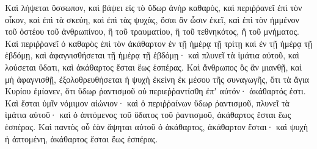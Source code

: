 {Καὶ λήψεται ὕσσωπον, καὶ βάψει εἰς τὸ ὕδωρ ἀνὴρ καθαρὸς, καὶ περιῤῥανεῖ ἐπὶ τὸν οἶκον, καὶ ἐπὶ τὰ σκεύη, καὶ ἐπὶ τὰς ψυχὰς, ὅσαι ἂν ὦσιν ἐκεῖ, καὶ ἐπὶ τὸν ἡμμένον τοῦ ὀστέου τοῦ ἀνθρωπίνου, ἢ τοῦ τραυματίου, ἢ τοῦ τεθνηκότος, ἢ τοῦ μνήματος.
Καὶ περιῤῥανεῖ ὁ καθαρὸς ἐπὶ τὸν ἀκάθαρτον ἐν τῇ ἡμέρᾳ τῇ τρίτῃ καὶ ἐν τῇ ἡμέρᾳ τῇ ἑβδόμῃ, καὶ ἀφαγνισθήσεται τῇ ἡμέρᾳ τῇ ἑβδόμῃ· καὶ πλυνεῖ τὰ ἱμάτια αὐτοῦ, καὶ λούσεται ὕδατι, καὶ ἀκάθαρτος ἔσται ἕως ἑσπέρας.
Καὶ ἄνθρωπος ὃς ἂν μιανθῇ, καὶ μὴ ἀφαγνισθῇ, ἐξολοθρευθήσεται ἡ ψυχὴ ἐκείνη ἐκ μέσου τῆς συναγωγῆς, ὅτι τὰ ἅγια Κυρίου ἐμίανεν, ὅτι ὕδωρ ῥαντισμοῦ οὐ περιεῤῥαντίσθη ἐπʼ αὐτόν· ἀκάθαρτός ἐστι.
Καὶ ἔσται ὑμῖν νόμιμον αἰώνιον· καὶ ὁ περιῤῥαίνων ὕδωρ ῥαντισμοῦ, πλυνεῖ τὰ ἱμάτια αὐτοῦ· καὶ ὁ ἁπτόμενος τοῦ ὕδατος τοῦ ῥαντισμοῦ, ἀκάθαρτος ἔσται ἕως ἑσπέρας.
Καὶ παντὸς οὗ ἐὰν ἅψηται αὐτοῦ ὁ ἀκάθαρτος, ἀκάθαρτον ἔσται· καὶ ψυχὴ ἡ ἁπτομένη, ἀκάθαρτος ἔσται ἕως ἑσπέρας.

}
